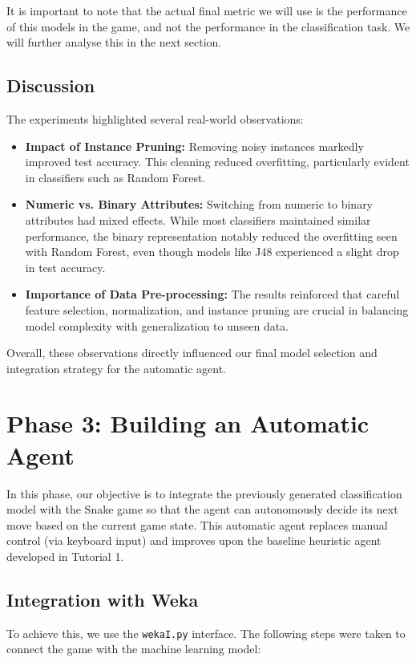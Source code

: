 \documentclass[12pt,a4paper]{article}
\begin{document}
It is important to note that the actual final metric we will use is the performance of this models in the game, and not the performance in the classification task.
We will further analyse this in the next section.




\subsection{Discussion}
The experiments highlighted several real-world observations:
\begin{itemize}
    \item \textbf{Impact of Instance Pruning:} Removing noisy instances markedly improved test accuracy. This cleaning reduced overfitting, particularly evident in classifiers such as Random Forest.
    \item \textbf{Numeric vs. Binary Attributes:} Switching from numeric to binary attributes had mixed effects. While most classifiers maintained similar performance, the binary representation notably reduced the overfitting seen with Random Forest, even though models like J48 experienced a slight drop in test accuracy.
    \item \textbf{Importance of Data Pre-processing:} The results reinforced that careful feature selection, normalization, and instance pruning are crucial in balancing model complexity with generalization to unseen data.
\end{itemize}

Overall, these observations directly influenced our final model selection and integration strategy for the automatic agent.


\section{Phase 3: Building an Automatic Agent}

In this phase, our objective is to integrate the previously generated classification model with the Snake game so that the agent can autonomously decide its next move based on the current game state. This automatic agent replaces manual control (via keyboard input) and improves upon the baseline heuristic agent developed in Tutorial 1.

\subsection{Integration with Weka}

To achieve this, we use the \texttt{wekaI.py} interface. The following steps were taken to connect the game with the machine learning model:
\end{document}
